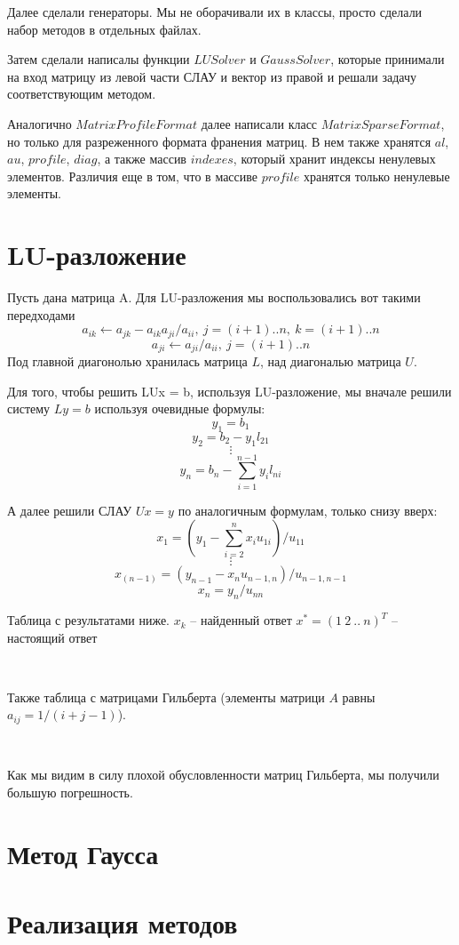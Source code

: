 Далее сделали генераторы. Мы не оборачивали их в классы, просто сделали набор методов в отдельных файлах.

Затем сделали написалы функции $LUSolver$ и $GaussSolver$, которые принимали на вход 
матрицу из левой части СЛАУ и вектор из правой и решали задачу соответствующим методом.

Аналогично $MatrixProfileFormat$ далее написали класс $MatrixSparseFormat$, но только для разреженного формата
франения матриц. В нем также хранятся $al$, $au$, $profile$, $diag$, а также массив $indexes$, 
который хранит индексы ненулевых элементов. Различия еще в том, что 
в массиве $profile$ хранятся только ненулевые элементы.

\newpage
\section{LU-разложение}

Пусть дана матрица A. Для LU-разложения мы воспользовались вот такими передходами
$$a_{ik} \leftarrow a_{jk} - a_{ik}a_{ji}/a_{ii}, \ j = (i + 1)..n, \ k = (i + 1)..n$$
$$a_{ji} \leftarrow a_{ji}/a_{ii}, \ j = (i + 1)..n$$
Под главной диагонолью хранилась матрица $L$, над диагональю матрица $U$.

Для того, чтобы решить LUx = b, используя LU-разложение, мы вначале решили систему $Ly = b$
используя очевидные формулы:
$$y_1 = b_1$$
$$y_2 = b_2 - y_1l_{21}$$
$$\vdots$$
$$y_n = b_n - \sum_{i = 1}^{n - 1}y_il_{ni}$$


А далее решили СЛАУ $Ux = y$ по аналогичным формулам, только снизу вверх:
$$x_1 = (y_1 - \sum_{i = 2}^{n}x_iu_{1i})/u_{11}$$
$$\vdots$$
$$x_(n - 1) = (y_{n - 1} - x_nu_{n - 1, n})/u_{n - 1, n - 1}$$
$$x_n = y_n/u_{nn}$$

Таблица с результатами ниже.
$x_k$ -- найденный ответ
$x^* = (1\ 2\ ..\ n)^T$ -- настоящий ответ


\

Также таблица с матрицами Гильберта (элементы матрици $A$ равны \newline $a_{ij} = 1/(i + j - 1)$).

\


Как мы видим в силу плохой обусловленности матриц Гильберта, мы получили большую погрешность.


\newpage
\section{Метод Гаусса}


\newpage
\section{Реализация методов}
